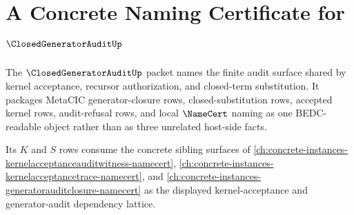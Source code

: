 \chapter{A Concrete Naming Certificate for $\ClosedGeneratorAuditUp$}
\label{ch:concrete-instances-closedgeneratoraudit-namecert}

The $\ClosedGeneratorAuditUp$ packet names the finite audit surface shared by kernel acceptance, recursor authorization, and closed-term substitution. It packages MetaCIC generator-closure rows, closed-substitution rows, accepted kernel rows, audit-refusal rows, and local $\NameCert$ naming as one BEDC-readable object rather than as three unrelated host-side facts.

Its $K$ and $S$ rows consume the concrete sibling surfaces of \autoref{ch:concrete-instances-kernelacceptanceauditwitness-namecert}, \autoref{ch:concrete-instances-kernelacceptancetrace-namecert}, and \autoref{ch:concrete-instances-generatorauditclosure-namecert} as the displayed kernel-acceptance and generator-audit dependency lattice.

